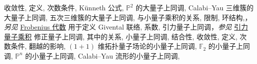 \begin{theindex}
\subsubitem \leavevmode\hypertarget{idx:1114}{收敛性},\enspace{}
\subsubitem \leavevmode\hypertarget{idx:1115}{定义},\enspace{}
\subsubitem \leavevmode\hypertarget{idx:1116}{次数条件},\enspace{}
\subsubitem \leavevmode\hypertarget{idx:1117}{K\"unneth 公式},\enspace{}
\subsubitem \leavevmode\hypertarget{idx:1118}{$\mathbb P^2$ 的大量子上同调},\enspace{}
\subsubitem \leavevmode\hypertarget{idx:1119}{Calabi--Yau 三维簇的大量子上同调},\enspace{}
\subsubitem \leavevmode\hypertarget{idx:1120}{五次三维簇的大量子上同调},\enspace{}
\subsubitem \leavevmode\hypertarget{idx:1121}{与小量子乘积的关系},\enspace{}
\subsubitem \leavevmode\hypertarget{idx:1122}{限制},\enspace{}
\subsubitem \leavevmode\hypertarget{idx:1123}{环结构},\enspace{}，\textit{另见} \hyperlink{idx:0337}{Frobenius 代数}
\subsubitem \leavevmode\hypertarget{idx:1124}{用于定义 Givental 联络},\enspace{}
\subitem \leavevmode\hypertarget{idx:1125}{系数},\enspace{}
\subitem \leavevmode\hypertarget{idx:1126}{引力量子上同调}，\textit{参见} \hyperlink{idx:0481}{引力量子乘积}
\subitem \leavevmode\hypertarget{idx:1127}{修正量子上同调},\enspace{}
\subsubitem \leavevmode\hypertarget{idx:1128}{其中的关系},\enspace{}
\subitem \leavevmode\hypertarget{idx:1129}{小量子上同调},\enspace{}
\subsubitem \leavevmode\hypertarget{idx:1130}{结合性},\enspace{}
\subsubitem \leavevmode\hypertarget{idx:1131}{收敛性},\enspace{}
\subsubitem \leavevmode\hypertarget{idx:1132}{定义},\enspace{}
\subsubitem \leavevmode\hypertarget{idx:1133}{次数条件},\enspace{}
\subsubitem \leavevmode\hypertarget{idx:1134}{翻越的影响},\enspace{}
\subsubitem \leavevmode\hypertarget{idx:1135}{$(1+1)$ 维拓扑量子场论的小量子上同调},\enspace{}
\subsubitem \leavevmode\hypertarget{idx:1136}{$\mathbb F_2$ 的小量子上同调},\enspace{}
\subsubitem \leavevmode\hypertarget{idx:1137}{$\mathbb P^n$ 的小量子上同调},\enspace{}
\subsubitem \leavevmode\hypertarget{idx:1138}{Calabi--Yau 流形的小量子上同调},\enspace{}

\end{theindex}
